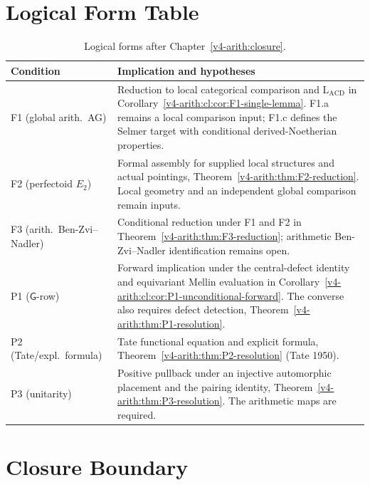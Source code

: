 \section{Logical Form Table}
\label{v4-arith:cl:form-update}

\begin{table}[h]
\centering
\small
\begin{tabular}{@{}>{\raggedright\arraybackslash}p{}|>{\raggedright\arraybackslash}p{}@{}}
Condition & Implication and hypotheses \\
\hline
F1 (global arith.~AG) & Reduction to local categorical comparison and \(\mathrm{L}_{\mathrm{ACD}}\) in Corollary~\ref{v4-arith:cl:cor:F1-single-lemma}. F1.a remains a local comparison input; F1.c defines the Selmer target with conditional derived-Noetherian properties. \\
F2 (perfectoid \(E_2\)) & Formal assembly for supplied local structures and actual pointings, Theorem~\ref{v4-arith:thm:F2-reduction}. Local geometry and an independent global comparison remain inputs. \\
F3 (arith.~Ben-Zvi--Nadler) & Conditional reduction under F1 and F2 in Theorem~\ref{v4-arith:thm:F3-reduction}; arithmetic Ben-Zvi--Nadler identification remains open. \\
P1 (\(\mathsf G\)-row) & Forward implication under the central-defect identity and equivariant Mellin evaluation in Corollary~\ref{v4-arith:cl:cor:P1-unconditional-forward}. The converse also requires defect detection, Theorem~\ref{v4-arith:thm:P1-resolution}. \\
P2 (Tate/expl.~formula) & Tate functional equation and explicit formula, Theorem~\ref{v4-arith:thm:P2-resolution} (Tate 1950). \\
P3 (unitarity) & Positive pullback under an injective automorphic placement and the pairing identity, Theorem~\ref{v4-arith:thm:P3-resolution}. The arithmetic maps are required. \\
\end{tabular}
\caption{Logical forms after Chapter~\ref{v4-arith:closure}.}
\label{v4-arith:cl:table:form}
\end{table}

\clearpage
\section{Closure Boundary}
\label{v4-arith:cl:summary}

